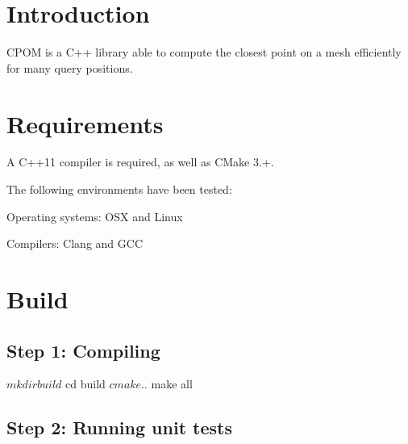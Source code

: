 \hypertarget{index_intro_sec}{}\section{Introduction}\label{index_intro_sec}
C\+P\+OM is a C++ library able to compute the closest point on a mesh efficiently for many query positions.\hypertarget{index_requirements_sec}{}\section{Requirements}\label{index_requirements_sec}
A C++11 compiler is required, as well as C\+Make 3.+.

The following environments have been tested\+:
\begin{DoxyItemize}
\item Operating systems\+: O\+SX and Linux
\item Compilers\+: Clang and G\+CC
\end{DoxyItemize}\hypertarget{index_install_sec}{}\section{Build}\label{index_install_sec}
\hypertarget{index_step1}{}\subsection{Step 1\+: Compiling}\label{index_step1}
\begin{DoxyVerb}$ mkdir build
$ cd build
$ cmake ..
$ make all
\end{DoxyVerb}
\hypertarget{index_step2}{}\subsection{Step 2\+: Running unit tests}\label{index_step2}



